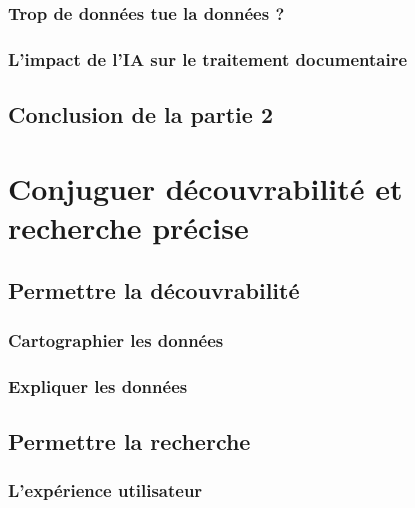 \documentclass[12pt,twoside, openany]{book} %
\begin{document}
	
	
	\section{Trop de données tue la données ?}
	
	
	
	\section{L'impact de l'IA sur le traitement documentaire}
	
	
	
\chapter*{Conclusion de la partie 2}


		
\part{Conjuguer découvrabilité et recherche précise}



	\chapter{Permettre la découvrabilité}
	
		\section{Cartographier les données}
		
		
		
		\section{Expliquer les données}
		
		
		
	\chapter{Permettre la recherche}
	
	\section{L'expérience utilisateur}
	
\end{document}
